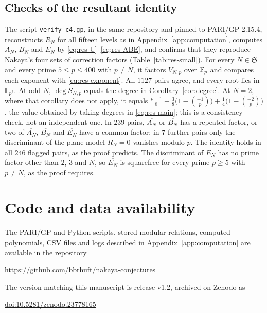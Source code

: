 \documentclass[11pt,a4paper]{article}
\theoremstyle{remark}\newtheorem{remark}[theorem]{Remark}
\numberwithin{equation}{section}
\newcommand{\leg}[2]{\left(\frac{#1}{#2}\right)}
\begin{document}
	\subsection{Checks of the resultant identity}\label{app:resultant}
	The script \texttt{verify\_c4.gp}, in the same repository and pinned to PARI/GP 2.15.4, reconstructs $R_N$ for all fifteen levels as in Appendix~\ref{app:computation}, computes $A_N$, $B_N$ and $E_N$ by \eqref{eq:res-U}--\eqref{eq:res-ABE}, and confirms that they reproduce Nakaya's four sets of correction factors (Table~\ref{tab:res-small}). For every $N\in\mathfrak S$ and every prime $5\leq p\leq400$ with $p\neq N$, it factors $V_{N,p}$ over $\mathbb F_p$ and compares each exponent with \eqref{eq:res-exponent}. All $1127$ pairs agree, and every root lies in $\mathbb F_{p^2}$. At odd $N$, $\deg S_{N,p}$ equals the degree in Corollary~\ref{cor:degree}. At $N=2$, where that corollary does not apply, it equals $\frac{p-1}8+\frac38\bigl(1-\leg{-1}{p}\bigr)+\frac14\bigl(1-\leg{-2}{p}\bigr)$, the value obtained by taking degrees in \eqref{eq:res-main}; this is a consistency check, not an independent one. In $239$ pairs, $\overline{A_N}$ or $\overline{B_N}$ has a repeated factor, or two of $\overline{A_N}$, $\overline{B_N}$ and $\overline{E_N}$ have a common factor; in $7$ further pairs only the discriminant of the plane model $R_N=0$ vanishes modulo $p$. The identity holds in all $246$ flagged pairs, as the proof predicts. The discriminant of $E_N$ has no prime factor other than $2$, $3$ and $N$, so $\overline{E_N}$ is squarefree for every prime $p\geq5$ with $p\neq N$, as the proof requires.
	
	\section*{Code and data availability}
	The PARI/GP and Python scripts, stored modular relations, computed polynomials, CSV files and logs described in Appendix~\ref{app:computation} are available in the repository
	\begin{center}\url{https://github.com/bbrhuft/nakaya-conjectures}\end{center}
	The version matching this manuscript is release v1.2, archived on Zenodo as
	\begin{center}\href{https://doi.org/10.5281/zenodo.23778165}{doi:10.5281/zenodo.23778165}\end{center}
	
\end{document}

